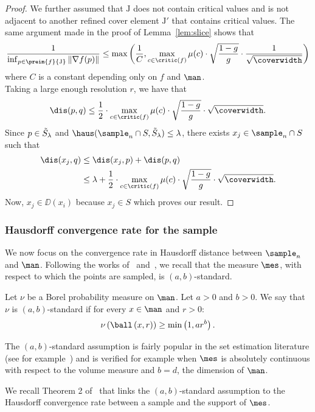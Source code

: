 \begin{proof}
We further assumed that $\mathrm{J}$ does not contain critical values and is not adjacent to another refined cover element $\mathrm{J}'$ that contains critical values. The same argument made in the proof of Lemma~\ref{lem:slice} shows that
$$\frac{1}{\inf_{p\in \preim{f}{\mathrm{J}}}\Vert\nabla f(p)\Vert}\leq \max\left(\frac{1}{C},\max_{c\in\critic(f)}\mu(c)\cdot\sqrt{\frac{1-g}{g}}\cdot\frac{1}{\sqrt{\coverwidth}}\right)$$
where $C$ is a constant depending only on $f$ and $\man$.\\
Taking a large enough resolution $r$, we have that
$$\dis(p,q)\leq\frac{1}{2}\cdot\max_{c\in\critic(f)}\mu(c)\cdot\sqrt{\frac{1-g}{g}}\cdot\sqrt{\coverwidth}.$$
Since $p\in\Tilde{S}_\lambda$ and $\haus(\sample_n\cap S,\Tilde{S}_\lambda)\leq\lambda$, there exists $x_j\in\sample_n\cap S$ such that 
%
\begin{align*}
\dis(x_j,q)&\leq\dis(x_j,p)+\dis(p,q)\\
&\leq \lambda+\frac{1}{2}\cdot\max_{c\in\critic(f)}\mu(c)\cdot\sqrt{\frac{1-g}{g}}\cdot\sqrt{\coverwidth}.
\end{align*}
%
Now, $x_j\in\DD(x_i)$ because $x_j\in S$ which proves our result.
\end{proof}


\subsubsection{Hausdorff convergence rate for the sample}
We now focus on the convergence rate in Hausdorff distance between $\sample_n$ and $\man$. Following the works of~\cite{chazal2014convergence} and~\cite{carriere2018statistical}, we recall that the measure $\mes$, with respect to which the points are sampled, is $(a,b)$-standard.  

\begin{definition}
Let $\nu$ be a Borel probability measure on $\man$. Let $a>0$ and $b>0$.
We say that $\nu$ is $(a,b)$-standard if for every $x\in\man$ and $r>0$:
$$\nu\left(\ball\left(x,r\right)\right)\geq \min\left(1,ar^b\right).$$
\end{definition}

 The $(a,b)$-standard assumption is fairly popular in the set estimation literature (see for example~\cite{cuevas2009set}) and is verified for example when $\mes$ is absolutely continuous with respect to the volume measure and $b=d$, the dimension of $\man$.
 
We recall Theorem 2 of~\cite{chazal2014convergence} that links the $(a,b)$-standard assumption to the Hausdorff convergence rate between a sample and the support of $\mes$.
 
